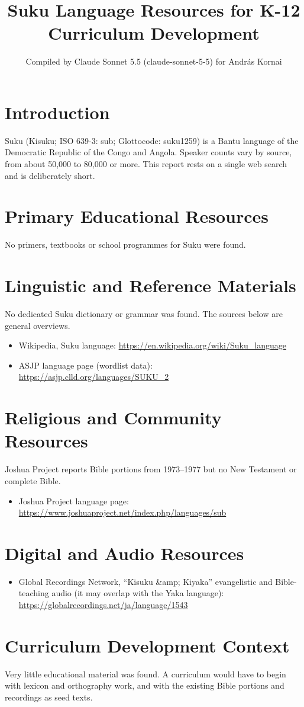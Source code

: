 \documentclass[12pt]{article}
\title{Suku Language Resources for K-12 Curriculum Development}
\author{Compiled by Claude Sonnet 5.5 (claude-sonnet-5-5) for Andr\'as Kornai}
\date{}
\begin{document}
\maketitle

\section{Introduction}
Suku (Kisuku; ISO 639-3: sub; Glottocode: suku1259) is a Bantu language of the Democratic Republic of the Congo and Angola. Speaker counts vary by source, from about 50,000 to 80,000 or more. This report rests on a single web search and is deliberately short.

\section{Primary Educational Resources}
No primers, textbooks or school programmes for Suku were found.

\section{Linguistic and Reference Materials}
No dedicated Suku dictionary or grammar was found. The sources below are general overviews.
\begin{itemize}
\item Wikipedia, Suku language: \url{https://en.wikipedia.org/wiki/Suku_language}
\item ASJP language page (wordlist data): \url{https://asjp.clld.org/languages/SUKU_2}
\end{itemize}

\section{Religious and Community Resources}
Joshua Project reports Bible portions from 1973--1977 but no New Testament or complete Bible.
\begin{itemize}
\item Joshua Project language page: \url{https://www.joshuaproject.net/index.php/languages/sub}
\end{itemize}

\section{Digital and Audio Resources}
\begin{itemize}
\item Global Recordings Network, ``Kisuku \&amp; Kiyaka'' evangelistic and Bible-teaching audio (it may overlap with the Yaka language): \url{https://globalrecordings.net/ja/language/1543}
\end{itemize}

\section{Curriculum Development Context}
Very little educational material was found. A curriculum would have to begin with lexicon and orthography work, and with the existing Bible portions and recordings as seed texts.
\end{document}
